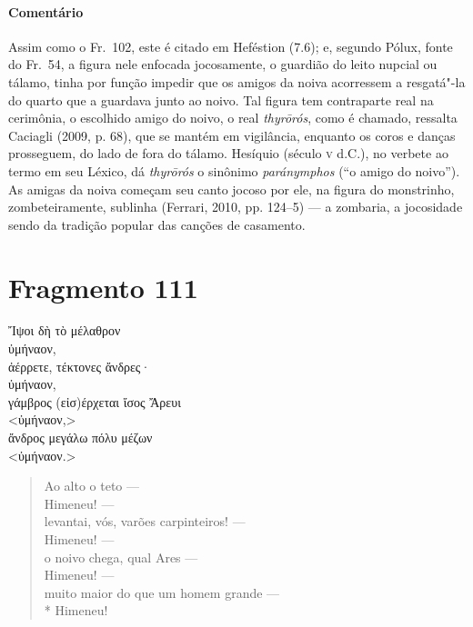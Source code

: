 {{\paragraph{Comentário} Assim como o Fr.~102, este é citado em Heféstion (7.6); e, segundo Pólux, fonte do Fr.~54, a figura nele enfocada jocosamente, o guardião do leito nupcial ou tálamo, 
tinha por função impedir que os amigos da noiva acorressem a resgatá"-la do
quarto que a guardava junto ao noivo.
Tal figura tem contraparte real na cerimônia, o escolhido amigo do noivo, o real \textit{thyrōrós}, como é chamado, ressalta Caciagli (2009, p. 68), que se mantém em vigilância, enquanto os coros e danças prosseguem, do lado de fora do tálamo. Hesíquio (século \textsc{v} d.C.), no verbete ao termo em seu Léxico, dá \textit{thyrōrós} o sinônimo \textit{paránymphos} (``o amigo do noivo''). As amigas da noiva começam seu canto jocoso por ele, na figura do monstrinho, zombeteiramente, sublinha (Ferrari, 2010, pp. 124--5) --- a zombaria, a jocosidade sendo da tradição popular das canções de casamento.}


\section{Fragmento 111}

\begin{gkverse}
Ἴψοι δὴ τὸ μέλαθρον\\
ὐμήναον,\\
ἀέρρετε, τέκτονες ἄνδρες·\\
ὐμήναον,\\
γάμβρος \dagger{}(εἰσ)έρχεται ἴσος Ἄρευι\dagger{}\\
<ὐμήναον,>\\
ἄνδρος μεγάλω πόλυ μέζων\\
<ὐμήναον.>
\end{gkverse}

\begin{verse}
Ao alto o teto --- \\
Himeneu! --- \\
levantai, vós, varões carpinteiros! --- \\
Himeneu! --- \\
o noivo chega, qual Ares --- \\
Himeneu! --- \\
muito maior do que um homem grande ---\\*
Himeneu!
\end{verse}

}
